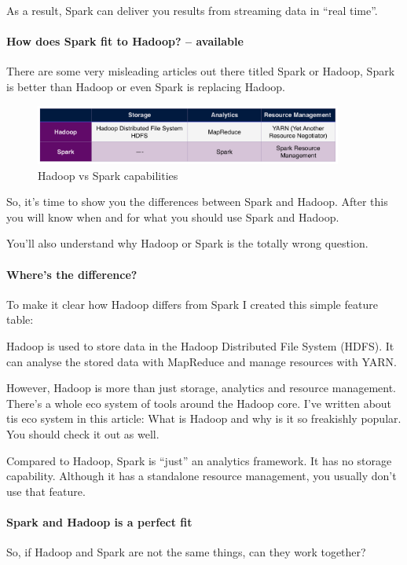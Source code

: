\documentclass[12pt]{scrartcl} %
\begin{document}
As a result, Spark can deliver you results from streaming data in “real time”.


\paragraph{How does Spark fit to Hadoop? -- available}
There are some very misleading articles out there titled Spark or Hadoop, Spark is better than Hadoop or even Spark is replacing Hadoop.

\begin{figure}[htbp] 
  \centering
     \includegraphics[width=0.9\textwidth]{images/Table-Hadoop-and-Spark}
  \caption{Hadoop vs Spark capabilities}
  \label{fig:Bild1}
\end{figure}



So, it's time to show you the differences between Spark and Hadoop. After this you will know when and for what you should use Spark and Hadoop.

You’ll also understand why Hadoop or Spark is the totally wrong question.

\paragraph{Where's the difference?}
To make it clear how Hadoop differs from Spark I created this simple feature table:


Hadoop is used to store data in the Hadoop Distributed File System (HDFS). It can analyse the stored data with MapReduce and manage resources with YARN.

However, Hadoop is more than just storage, analytics and resource management. There’s a whole eco system of tools around the Hadoop core. I’ve written about tis eco system in this article: What is Hadoop and why is it so freakishly popular. You should check it out as well.

Compared to Hadoop, Spark is “just” an analytics framework. It has no storage capability. Although it has a standalone resource management, you usually don’t use that feature.

\paragraph{Spark and Hadoop is a perfect fit}
So, if Hadoop and Spark are not the same things, can they work together?
\end{document}
